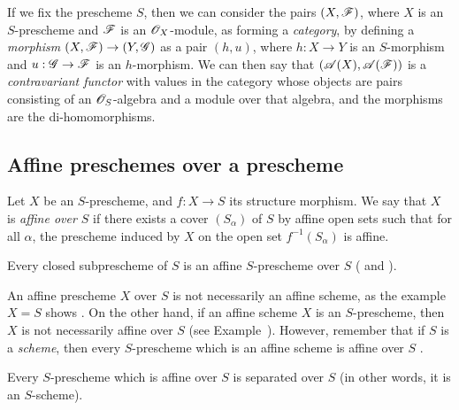 \begin{env}[1.1.3]
\label{II.1.1.3}
If we fix the prescheme $S$, then we can consider the pairs $(X,\mathscr{F})$, where $X$ is an $S$-prescheme and $\mathscr{F}$ is an $\mathscr{O}_X$-module, as forming a \emph{category}, by defining a \emph{morphism} $(X,\sh{F})\to(Y,\sh{G})$ as a pair $(h,u)$, where $h:X\to Y$ is an $S$-morphism and $u:\sh{G}\to\sh{F}$ is an $h$-morphism.
We can then say that $(\mathscr{A}(X),\mathscr{A}(\mathscr{F}))$ is a \emph{contravariant functor} with values in the category whose objects are pairs consisting of an $\mathscr{O}_S$-algebra and a module over that algebra, and the morphisms are the di-homomorphisms.
\end{env}

\subsection{Affine preschemes over a prescheme}
\label{subsection:II.1.2}

\begin{definition}[1.2.1]
\label{II.1.2.1}
Let $X$ be an $S$-prescheme, and $f:X\to S$ its structure morphism.
We say that $X$ is \emph{affine over $S$} if there exists a cover $(S_\alpha)$ of $S$ by affine open sets such that for all $\alpha$, the prescheme induced by $X$ on the open set $f^{-1}(S_\alpha)$ is affine.
\end{definition}

\begin{example}[1.2.2]
\label{II.1.2.2}
Every closed subprescheme of $S$ is an affine $S$-prescheme over $S$ ( and ).
\end{example}

\begin{remark}[1.2.3]
\label{II.1.2.3}
An affine prescheme $X$ over $S$ is not necessarily an affine scheme, as the example $X=S$ shows .
On the other hand, if an affine scheme $X$ is an $S$-prescheme, then $X$ is not necessarily affine over
$S$ (see Example~).
However, remember that if $S$ is a \emph{scheme}, then every $S$-prescheme which is an affine scheme is affine over $S$ .
\end{remark}

\begin{proposition}[1.2.4]
\label{II.1.2.4}
Every $S$-prescheme which is affine over $S$ is separated over $S$ (in other words, it is an $S$-scheme).
\end{proposition}

